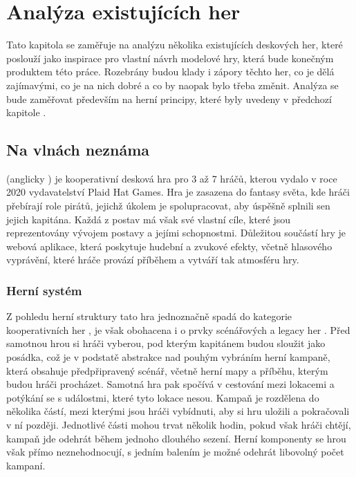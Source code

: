 \chapter{Analýza existujících her}
\label{chap:game_analysis}

Tato kapitola se zaměřuje na analýzu několika existujících deskových her, které poslouží jako inspirace pro vlastní návrh modelové hry, která bude konečným produktem této práce. Rozebrány budou klady i zápory těchto her, co je dělá zajímavými, co je na nich dobré a co by naopak bylo třeba změnit. Analýza se bude zaměřovat především na herní principy, které byly uvedeny v předchozí kapitole .



\section{Na vlnách neznáma}
\label{sec:forgotten_waters}

 (anglicky ) je kooperativní desková hra pro 3 až 7 hráčů, kterou vydalo v roce 2020 vydavatelství Plaid Hat Games. Hra je zasazena do fantasy světa, kde hráči přebírají role pirátů, jejichž úkolem je spolupracovat, aby úspěšně splnili sen jejich kapitána. Každá z postav má však své vlastní cíle, které jsou reprezentovány vývojem postavy a jejími schopnostmi. Důležitou součástí hry je webová aplikace, která poskytuje hudební a zvukové efekty, včetně hlasového vyprávění, které hráče provází příběhem a vytváří tak atmosféru hry. \cite{forgotten_waters}


\subsection{Herní systém}
\label{subsec:fw_gameplay}

Z pohledu herní struktury tato hra jednoznačně spadá do kategorie kooperativních her , je však obohacena i o prvky scénářových  a legacy her . Před samotnou hrou si hráči vyberou, pod kterým kapitánem budou sloužit jako posádka, což je v podstatě abstrakce nad pouhým vybráním herní kampaně, která obsahuje předpřipravený scénář, včetně herní mapy a příběhu, kterým budou hráči procházet. Samotná hra pak spočívá v cestování mezi lokacemi a potýkání se s událostmi, které tyto lokace nesou. Kampaň je rozdělena do několika částí, mezi kterými jsou hráči vybídnuti, aby si hru uložili a pokračovali v ní později. Jednotlivé části mohou trvat několik hodin, pokud však hráči chtějí, kampaň jde odehrát během jednoho dlouhého sezení. Herní komponenty se hrou však přímo neznehodnocují, s jedním balením je možné odehrát libovolný počet kampaní.

